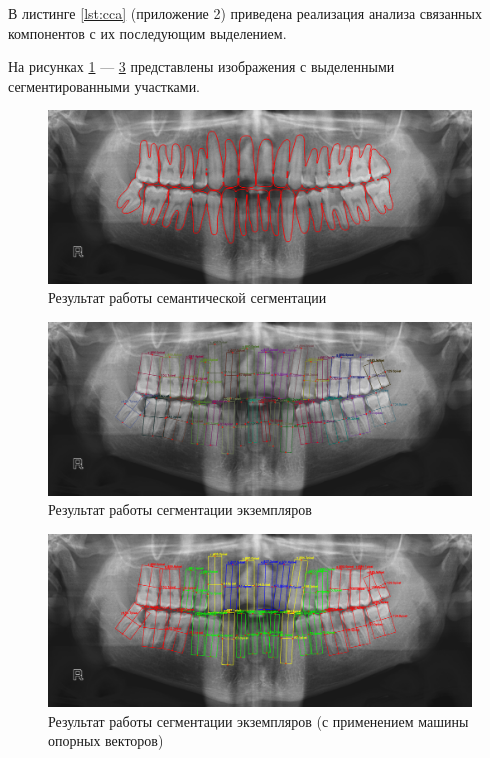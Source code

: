 В листинге \ref{lst:cca} (приложение 2)  приведена реализация анализа связанных компонентов с их последующим выделением.

На рисунках \ref{fig:segmented} --- \ref{fig:segmented_svm} представлены изображения с выделенными сегментированными участками.

\begin{figure}[H]
	\centering
	\includegraphics[width=\textwidth]{img/segmented.png}
	\caption{Результат работы семантической сегментации}
	\label{fig:segmented}
\end{figure}

\begin{figure}[H]
	\centering
	\includegraphics[width=\textwidth]{img/segmented_cca.png}
	\caption{Результат работы сегментации экземпляров}
	\label{fig:segmented_cca}
\end{figure}

\begin{figure}[H]
	\centering
	\includegraphics[width=\textwidth]{img/segmented_svm.png}
	\caption{Результат работы сегментации экземпляров (с применением машины опорных векторов)}
	\label{fig:segmented_svm}
\end{figure}

